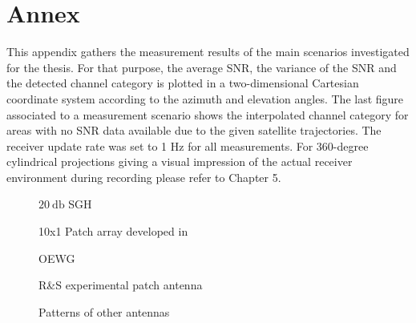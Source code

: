 \chapter{Annex}

This appendix gathers the measurement results of the main scenarios investigated
for the thesis. For that purpose, the average SNR, the variance of the SNR and
the detected channel category is plotted in a two-dimensional Cartesian coordinate
system according to the azimuth and elevation angles. The last figure associated to
a measurement scenario shows the interpolated channel category for areas with no
SNR data available due to the given satellite trajectories. The receiver update rate
was set to 1 Hz for all measurements. For 360-degree cylindrical projections giving
a visual impression of the actual receiver environment during recording please refer
to Chapter 5.
\begin{figure}[h]
  \centering
  \centering
\caption{$\SI{20}{\decibel}$ SGH}
\label{fig:hornpro}
\end{figure}

\begin{figure}[h]
  \centering
  \centering
\caption{10x1 Patch array developed in \cite{7481205}}
\label{fig:10x1a}
\end{figure}

\begin{figure}[h]
  \centering
  \centering
\caption{OEWG}
\label{fig:oewgpro}
\end{figure}

\begin{figure}[h]
  \centering
  \centering
\caption{R\&{}S experimental patch antenna}
\label{fig:patchpro}
\end{figure}


\begin{figure}[h]
  \centering
  \centering
  \centering
  \centering
\caption{Patterns of other antennas}
\label{fig:othera}
\end{figure}

